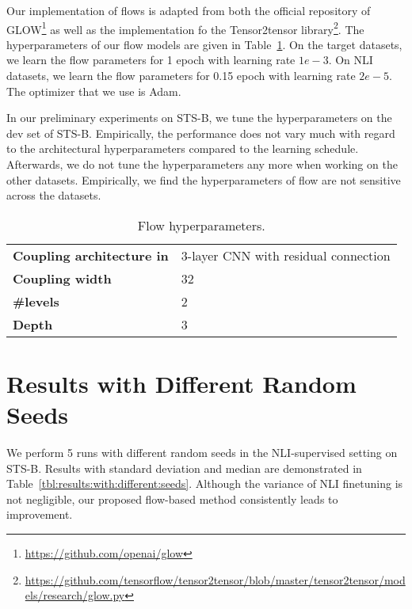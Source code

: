 \documentclass[11pt,a4paper]{article}
\begin{document}
Our implementation of flows is adapted from both the official repository of GLOW\footnote{\url{https://github.com/openai/glow}} as well as the implementation fo the Tensor2tensor library\footnote{\url{https://github.com/tensorflow/tensor2tensor/blob/master/tensor2tensor/models/research/glow.py}}. The hyperparameters of our flow models are given in Table~\ref{tab:flow:hyperparameter}. On the target datasets, we learn the flow parameters for 1 epoch with learning rate $1e-3$. On NLI datasets, we learn the flow parameters for 0.15 epoch with learning rate $2e-5$. The optimizer that we use is Adam. 

In our preliminary experiments on STS-B, we tune the hyperparameters on the dev set of STS-B. Empirically, the performance does not vary much with regard to the architectural hyperparameters compared to the learning schedule. Afterwards, we do not tune the hyperparameters any more when working on the other datasets. Empirically, we find the hyperparameters of flow are not sensitive across the datasets.

\begin{table}[!h]
\centering
\begin{tabular}{ll}
\toprule
\bf Coupling architecture in  &  3-layer CNN with residual connection \\
\bf Coupling width & 32 \\
\bf \#levels & 2 \\
\bf Depth & 3 \\
\bottomrule
\end{tabular}
\caption{\label{tab:flow:hyperparameter} Flow hyperparameters.}
\end{table}






\newpage
\section{Results with Different Random Seeds}
\label{sec:appendix:results:with:different:seeds}
We perform 5 runs with different random seeds in the NLI-supervised setting on STS-B. Results with standard deviation and median are demonstrated in Table~\ref{tbl:results:with:different:seeds}. Although the variance of NLI finetuning is not negligible, our proposed flow-based method consistently leads to improvement.

\begin{table}[!h]
\centering
{}
\caption{Results with different random seeds.}
\label{tbl:results:with:different:seeds}
\end{table}

 
\end{document}
